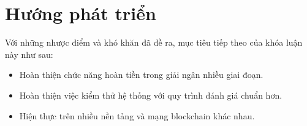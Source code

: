 \documentclass[../main-report.tex]{subfiles}
\begin{document}
\section{Hướng phát triển}
Với những nhược điểm và khó khăn đã đề ra, mục tiêu tiếp theo của khóa luận này như sau:

\begin{itemize}
\item Hoàn thiện chức năng hoàn tiền trong giải ngân nhiều giai đoạn.
\item Hoàn thiện việc kiểm thử hệ thống với quy trình đánh giá chuẩn hơn.
\item Hiện thực trên nhiều nền tảng và mạng blockchain khác nhau.
\end{itemize}
\end{document}
